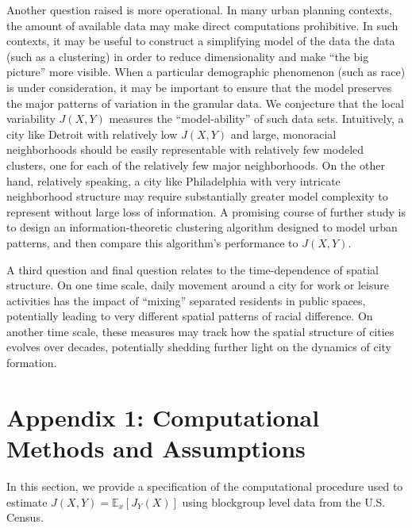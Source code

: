 \documentclass[english]{scrartcl}
\newcommand\E[0]{\mathbb{E}}
\begin{document}
	Another question raised is more operational. In many urban planning contexts, the amount of available data may make direct computations prohibitive. In such contexts, it may be useful to construct a simplifying model of the data the data (such as a clustering) in order to reduce dimensionality and make ``the big picture'' more visible. When a particular demographic phenomenon (such as race) is under consideration, it may be important to ensure that the model preserves the major patterns of variation in the granular data. We conjecture that the local variability $J(X,Y)$ measures the ``model-ability'' of such data sets. Intuitively, a city like Detroit with relatively low $J(X,Y)$ and large, monoracial neighborhoods should be easily representable with relatively few modeled clusters, one for each of the relatively few major neighborhoods. On the other hand, relatively speaking, a city like Philadelphia with very intricate neighborhood structure may require substantially greater model complexity to represent without large loss of information. A promising course of further study is to design an information-theoretic clustering algorithm designed to model urban patterns, and then compare this algorithm's performance to $J(X,Y)$. 

	A third question and final question relates to the time-dependence of spatial structure. On one time scale, daily movement around a city for work or leisure activities has the impact of ``mixing'' separated residents in public spaces, potentially leading to very different spatial patterns of racial difference. On another time scale, these measures may track how the spatial structure of cities evolves over decades, potentially shedding further light on the dynamics of city formation. 		

{}

	
\section*{Appendix 1: Computational Methods and Assumptions}
	In this section, we provide a specification of the computational procedure used to estimate $J(X,Y) = \E_x[J_Y(X)]$ using blockgroup level data from the U.S. Census. 
\end{document}
